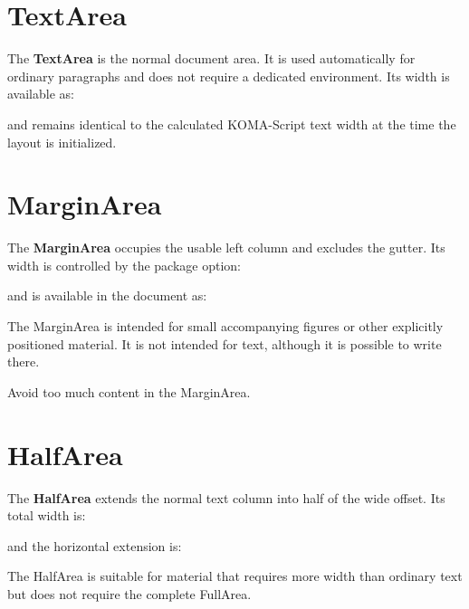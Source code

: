 \documentclass[
11pt,
a4paper,
oneside
]{scrbook}
\begin{document}
\section{TextArea}

The \textbf{TextArea} is the normal document area.
It is used automatically for ordinary paragraphs and does not require a
dedicated environment.
Its width is available as:




and remains identical to the calculated KOMA-Script text width at the time
the layout is initialized.

\section{MarginArea}

The \textbf{MarginArea} occupies the usable left column and excludes the
gutter.
Its width is controlled by the package option:





and is available in the document as:




The MarginArea is intended for small accompanying figures or other explicitly
positioned material. It is not intended for text, although it is possible to write there.

\begin{MarginArea}
	\begin{warning}
		Avoid too much content in the MarginArea.
	\end{warning}
\end{MarginArea}

\section{HalfArea}
\begin{HalfArea}
The \textbf{HalfArea} extends the normal text column into half of the wide
offset.
Its total width is:




and the horizontal extension is:




The HalfArea is suitable for material that requires more width than ordinary
text but does not require the complete FullArea.
\end{HalfArea}
\end{document}
